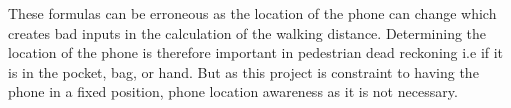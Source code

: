 These formulas can be erroneous as the location of the phone can change which creates bad inputs in the calculation of the walking distance.
Determining the location of the phone is therefore important in pedestrian dead reckoning i.e if it is in the pocket, bag, or hand. But as this project is constraint to having the phone in a fixed position, phone location awareness as it is not necessary.
